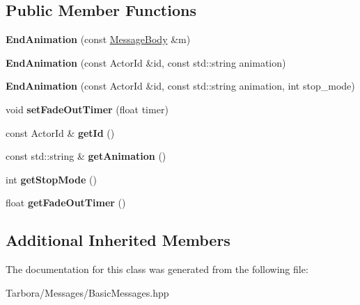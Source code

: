 \subsection*{Public Member Functions}
\begin{DoxyCompactItemize}
\item 
\mbox{\label{classTarbora_1_1Message_1_1EndAnimation_a2ffbb042ca31f55dcc15bd01c540f8a4}} 
{\bfseries End\+Animation} (const \hyperlink{classTarbora_1_1MessageBody}{Message\+Body} \&m)
\item 
\mbox{\label{classTarbora_1_1Message_1_1EndAnimation_a4f3cbe8ddbdad7e08a90a03b69b13f50}} 
{\bfseries End\+Animation} (const Actor\+Id \&id, const std\+::string animation)
\item 
\mbox{\label{classTarbora_1_1Message_1_1EndAnimation_a93d25f07aacf24391432931fdabd33a9}} 
{\bfseries End\+Animation} (const Actor\+Id \&id, const std\+::string animation, int stop\+\_\+mode)
\item 
\mbox{\label{classTarbora_1_1Message_1_1EndAnimation_a029d4e1e00cec0517e57346153aaa598}} 
void {\bfseries set\+Fade\+Out\+Timer} (float timer)
\item 
\mbox{\label{classTarbora_1_1Message_1_1EndAnimation_af914e3f0edbfffa24feab22490c6e593}} 
const Actor\+Id \& {\bfseries get\+Id} ()
\item 
\mbox{\label{classTarbora_1_1Message_1_1EndAnimation_a5d43a4c9fc97db59d4e17aab37862ba0}} 
const std\+::string \& {\bfseries get\+Animation} ()
\item 
\mbox{\label{classTarbora_1_1Message_1_1EndAnimation_a01176b41bbbd479cd724cae3e1d778a7}} 
int {\bfseries get\+Stop\+Mode} ()
\item 
\mbox{\label{classTarbora_1_1Message_1_1EndAnimation_a87a9343fc6a89bbd6861274283bfb6b0}} 
float {\bfseries get\+Fade\+Out\+Timer} ()
\end{DoxyCompactItemize}
\subsection*{Additional Inherited Members}


The documentation for this class was generated from the following file\+:\begin{DoxyCompactItemize}
\item 
Tarbora/\+Messages/Basic\+Messages.\+hpp\end{DoxyCompactItemize}
